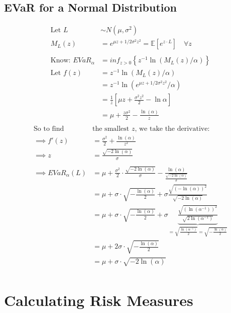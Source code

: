 \documentclass[
  oneside]{book}
\begin{document}
\hypertarget{evar-for-a-normal-distribution}{%
\subsection{EVaR for a Normal Distribution}\label{evar-for-a-normal-distribution}}

\[
\begin{aligned}
\text{Let } L &\sim N(\mu, \sigma^{2})\\
M_{L}(z) &= e^{\mu z+1/2 \sigma^{2}z^{2}} = \mathbb{E}[e^{z\cdot L}]\quad \forall z\\
\\
\text{Know: }EVaR_{\alpha} &= inf_{z>0} \left\{ z^{-1} \ln(M_{L}(z) / \alpha) \right\}\\
\text{Let } f(z) &= z^{-1} \ln(M_{L}(z) / \alpha)\\
&= z^{-1} \ln(e^{\mu z+1/2 \sigma^{2}z^{2}} / \alpha)\\
&= \frac{1}{z}\left[ \mu z+\frac{\sigma^{2}z^{2}}{2}-\ln \alpha \right]\\
&= \mu + \frac{z\sigma^{2}}{2} - \frac{\ln(\alpha)}{z}\\
\end{aligned}
\]
\[
\begin{aligned}
\text{So to find }& \text{the smallest $z$, we take the derivative:}\\
\implies f'(z) &= \frac{\sigma^{2}}{2}+\frac{\ln(\alpha)}{z^{2}}\\
\implies z &= \frac{\sqrt{-2\ln(\alpha)}}{\sigma}\\
\\
\implies EVaR_{\alpha}(L) &= \mu + \frac{\sigma^{2}}{2}\cdot \frac{\sqrt{-2\ln(\alpha)}}{\sigma} - \frac{\ln(\alpha)}{\frac{\sqrt{-2\ln(\alpha)}}{\sigma}}\\
&= \mu + \sigma \cdot \sqrt{-\frac{\ln(\alpha)}{2}} + \sigma \frac{\sqrt{(-\ln(\alpha))^{2} }}{\sqrt{-2\ln(\alpha)}}\\
&= \mu + \sigma \cdot \sqrt{-\frac{\ln(\alpha)}{2}} + \sigma \underbrace{ \frac{\sqrt{(\ln(\alpha ^{-1}))^{2} }}{\sqrt{2\ln(\alpha ^{-1})}} }_{= \sqrt{ \frac{\ln(\alpha ^{-1})}{2} }  = \sqrt{ -\frac{\ln(\alpha)}{2} }}\\
&= \mu + 2\sigma \cdot \sqrt{-\frac{\ln(\alpha)}{2}}\\
&= \mu + \sigma \cdot \sqrt{-2\ln(\alpha)}\\
\end{aligned}
\]

\hypertarget{calculating-risk-measures}{%
\section{Calculating Risk Measures}\label{calculating-risk-measures}}
\end{document}
